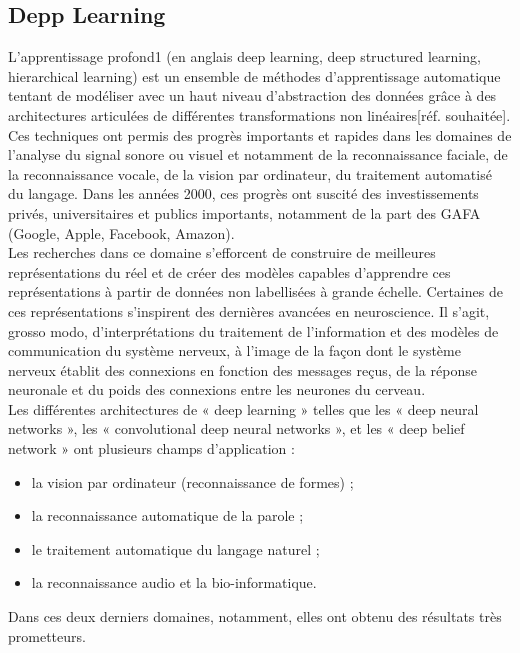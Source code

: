 \subsection{Depp Learning}
L'apprentissage profond1 (en anglais deep learning, deep structured learning, hierarchical learning) est un ensemble de méthodes d'apprentissage automatique tentant de modéliser avec un haut niveau d’abstraction des données grâce à des architectures articulées de différentes transformations non linéaires[réf. souhaitée]. Ces techniques ont permis des progrès importants et rapides dans les domaines de l'analyse du signal sonore ou visuel et notamment de la reconnaissance faciale, de la reconnaissance vocale, de la vision par ordinateur, du traitement automatisé du langage. Dans les années 2000, ces progrès ont suscité des investissements privés, universitaires et publics importants, notamment de la part des GAFA (Google, Apple, Facebook, Amazon).\\[0.5cm]
Les recherches dans ce domaine s’efforcent de construire de meilleures représentations du réel et de créer des modèles capables d’apprendre ces représentations à partir de données non labellisées à grande échelle. Certaines de ces représentations s’inspirent des dernières avancées en neuroscience. Il s'agit, grosso modo, d'interprétations du traitement de l’information et des modèles de communication du système nerveux, à l'image de la façon dont le système nerveux établit des connexions en fonction des messages reçus, de la réponse neuronale et du poids des connexions entre les neurones du cerveau.\\
Les différentes architectures de « deep learning » telles que les « deep neural networks », les « convolutional deep neural networks », et les « deep belief network » ont plusieurs champs d’application :
\begin{itemize}
\item la vision par ordinateur (reconnaissance de formes) ;
\item la reconnaissance automatique de la parole ;
\item le traitement automatique du langage naturel ;
\item la reconnaissance audio et la bio-informatique.
\end{itemize}
Dans ces deux derniers domaines, notamment, elles ont obtenu des résultats très prometteurs.
